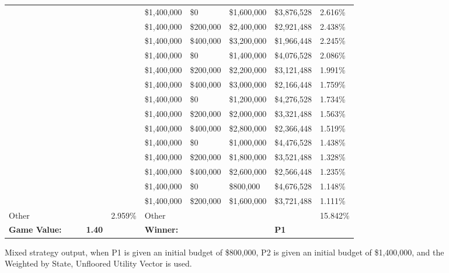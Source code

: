 \documentclass[11pt]{article}
\begin{document}
\begin{figure}
\begin{tabular}{ |p{1.0cm}p{1.0cm}p{1.0cm}p{2.0cm}|p{1.0cm}||p{1.0cm}p{1.0cm}p{1.0cm}p{2.0cm}|p{1.0cm}|}
&  &  &  &  & \$1,400,000 & \$0 & \$1,600,000 & \$3,876,528 & 2.616\% \\
&  &  &  &  & \$1,400,000 & \$200,000 & \$2,400,000 & \$2,921,488 & 2.438\% \\
&  &  &  &  & \$1,400,000 & \$400,000 & \$3,200,000 & \$1,966,448 & 2.245\% \\
&  &  &  &  & \$1,400,000 & \$0 & \$1,400,000 & \$4,076,528 & 2.086\% \\
&  &  &  &  & \$1,400,000 & \$200,000 & \$2,200,000 & \$3,121,488 & 1.991\% \\
&  &  &  &  & \$1,400,000 & \$400,000 & \$3,000,000 & \$2,166,448 & 1.759\% \\
&  &  &  &  & \$1,400,000 & \$0 & \$1,200,000 & \$4,276,528 & 1.734\% \\
&  &  &  &  & \$1,400,000 & \$200,000 & \$2,000,000 & \$3,321,488 & 1.563\% \\
&  &  &  &  & \$1,400,000 & \$400,000 & \$2,800,000 & \$2,366,448 & 1.519\% \\
&  &  &  &  & \$1,400,000 & \$0 & \$1,000,000 & \$4,476,528 & 1.438\% \\
&  &  &  &  & \$1,400,000 & \$200,000 & \$1,800,000 & \$3,521,488 & 1.328\% \\
&  &  &  &  & \$1,400,000 & \$400,000 & \$2,600,000 & \$2,566,448 & 1.235\% \\
&  &  &  &  & \$1,400,000 & \$0 & \$800,000 & \$4,676,528 & 1.148\% \\
&  &  &  &  & \$1,400,000 & \$200,000 & \$1,600,000 & \$3,721,488 & 1.111\% \\
\hline
Other &  &  &  & 2.959\% & Other &  &  &  & 15.842\% \\
\hline
\small \textbf{Game Value:} &&& \small \textbf{1.40} && \small \textbf{Winner:} &&& \small \textbf{P1}&\\
\hline
\end{tabular}
\caption{Mixed strategy output, when P1 is given an initial budget of \$800,000, P2 is given an initial budget of \$1,400,000, and the Weighted by State, Unfloored Utility Vector is used.}
\label{8v14table.5}
\end{figure}
\end{document}
